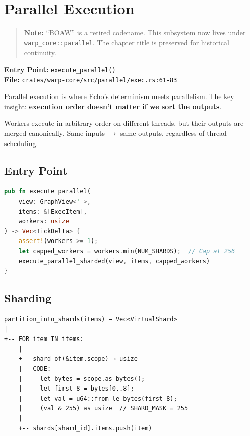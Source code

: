 
\chapter{Parallel Execution}
\label{chap:tour-boaw}

\begin{quote}
\textbf{Note:} ``BOAW'' is a retired codename. This subsystem now lives under
\texttt{warp\_core::parallel}. The chapter title is preserved for historical
continuity.
\end{quote}

\textbf{Entry Point:} \texttt{execute\_parallel()} \\
\textbf{File:} \texttt{crates/warp-core/src/parallel/exec.rs:61-83}

\begin{bigpicture}
Parallel execution is where Echo's determinism meets parallelism. The key insight: \textbf{execution order doesn't matter if we sort the outputs}.

Workers execute in arbitrary order on different threads, but their outputs are merged canonically. Same inputs $\rightarrow$ same outputs, regardless of thread scheduling.
\end{bigpicture}

\section{Entry Point}

\begin{lstlisting}[language=Rust]
pub fn execute_parallel(
    view: GraphView<'_>,
    items: &[ExecItem],
    workers: usize
) -> Vec<TickDelta> {
    assert!(workers >= 1);
    let capped_workers = workers.min(NUM_SHARDS);  // Cap at 256
    execute_parallel_sharded(view, items, capped_workers)
}
\end{lstlisting}

\section{Sharding}

\begin{verbatim}
partition_into_shards(items) → Vec<VirtualShard>
|
+-- FOR item IN items:
    |
    +-- shard_of(&item.scope) → usize
    |   CODE:
    |     let bytes = scope.as_bytes();
    |     let first_8 = bytes[0..8];
    |     let val = u64::from_le_bytes(first_8);
    |     (val & 255) as usize  // SHARD_MASK = 255
    |
    +-- shards[shard_id].items.push(item)
\end{verbatim}

